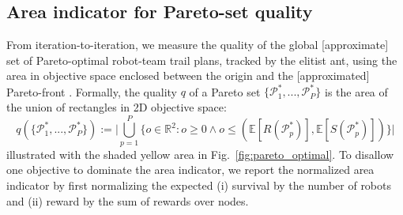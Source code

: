 \documentclass[fleqn,10pt,lineno]{wlpeerj}
\begin{document}



\subsection{Area indicator for Pareto-set quality}
From iteration-to-iteration, we measure the quality of the global [approximate] set of Pareto-optimal robot-team trail plans, tracked by the elitist ant, using the area in objective space enclosed between the origin and the [approximated] Pareto-front \cite{cao2015using,guerreiro2020hypervolume}. Formally, the quality $q$ of a Pareto set $\{\mathcal{P}^*_1, ...,\mathcal{P}^*_P\}$ is the area of the union of rectangles in 2D objective space:
\begin{equation}
	q(\{\mathcal{P}^*_1, ...,\mathcal{P}^*_{P}\}):=
	\Big \lvert 
		\bigcup_{p=1}^P \{ o \in \mathbb{R}^2 : o \geq 0 \wedge  o \leq (\mathbb{E}[R(\mathcal{P}^*_p)], \mathbb{E}[S(\mathcal{P}^*_p)]) \} 
	\Big \rvert \label{eq:q}	
\end{equation}
illustrated with the shaded yellow area in Fig.~\ref{fig:pareto_optimal}.
To disallow one objective to dominate the area indicator, we report the normalized area indicator by first normalizing the expected 
(i) survival by the number of robots and (ii) reward by the sum of rewards over nodes.
\end{document}
